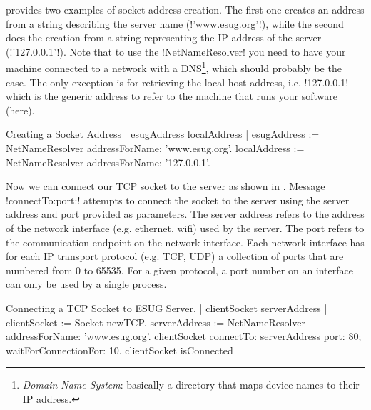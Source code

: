 \documentclass[a4paper,10pt,twoside]{book}
\begin{document}
 provides two examples of socket address creation.
The first one creates an address from a string describing the server name (\ct!'www.esug.org'!), while the second does the creation from a string representing the  IP address of the server (\ct!'127.0.0.1'!).
Note that to use the \ct!NetNameResolver! you need to have your machine connected to a network with a DNS\footnote{\emph{Domain Name System}: basically a directory that maps device names to their IP address.}, which should probably be the case.
The only exception is for retrieving the local host address, i.e. \ct!127.0.0.1! which is the generic address to refer to the machine that runs your software (\pharo here).


\begin{script}[creatingSocketAddress]{Creating a Socket Address}
| esugAddress localAddress |
esugAddress := NetNameResolver addressForName: 'www.esug.org'.
localAddress := NetNameResolver addressForName: '127.0.0.1'.
\end{script}

Now we can connect our TCP socket to the server as shown in .
Message \ct!connectTo:port:! attempts to connect the socket to the server using the server address and port provided as parameters.
The server address refers to the address of the network interface (e.g. ethernet, wifi) used by the server.
The port refers to the communication endpoint on the network interface. 
Each network interface has for each IP transport protocol (e.g. TCP, UDP) a collection of ports that are numbered from 0 to 65535.
For a given protocol, a port number on an interface can only be used by a single process.

\begin{script}[connectingTcpSocket]{Connecting a TCP Socket to ESUG Server.}
| clientSocket serverAddress |
clientSocket := Socket newTCP.
serverAddress := NetNameResolver addressForName: 'www.esug.org'.
clientSocket 
	connectTo: serverAddress port: 80;
	waitForConnectionFor: 10.
clientSocket isConnected
\end{script}
\end{document}
